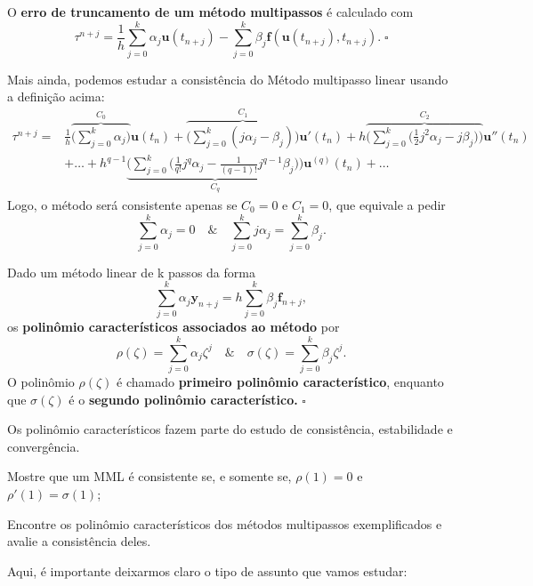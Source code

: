 \documentclass[../differential_methods.tex]{subfiles}
\begin{document}
\begin{def*}
	O \textbf{erro de truncamento de um método multipassos} é calculado com
	\[
		\tau^{n+j} = \frac{1}{h}\sum\limits_{j=0}^{k}\alpha_{j}\mathbf{u}(t_{n+j}) - \sum\limits_{j=0}^{k} \beta_{j}\mathbf{f}(\mathbf{u}(t_{n+j}), t_{n+j}). \; \square
	\]
\end{def*}
Mais ainda, podemos estudar a consistência do Método multipasso linear usando a definição acima:
\begin{align*}
	\tau^{n+j} = & \frac{1}{h}\overbrace{\biggl(\sum\limits_{j=0}^{k}\alpha_{j}\biggr)}^{C_{0}}\mathbf{u}(t_{n}) + \overbrace{\biggl(\sum\limits_{j=0}^{k}(j\alpha_{j}-\beta_{j})\biggr)}^{C_1}\mathbf{u}'(t_{n}) + h \overbrace{\biggl(\sum\limits_{j=0}^{k}\biggl(\frac{1}{2}j^{2}\alpha_{j}-j\beta_{j}\biggr) \biggr)}^{C_2}\mathbf{u}''(t_{n}) \\
	             & +\dotsc + h^{q-1}\underbrace{\biggl(\sum\limits_{j=0}^{k}\biggl(\frac{1}{q!}j^{q}\alpha_{j} - \frac{1}{(q-1)!}j^{q-1}\beta_{j}\biggr)\biggr)}_{C_q} \mathbf{u}^{(q)}(t_{n}) + \dotsc
\end{align*}
Logo, o método será consistente apenas se \(C_{0} = 0\) e \(C_{1}=0\), que equivale a pedir
\[
	\sum\limits_{j=0}^{k}\alpha_{j} = 0 \quad\&\quad \sum\limits_{j=0}^{k}j\alpha_{j} = \sum\limits_{j=0}^{k}\beta_{j}.
\]
\begin{def*}
	Dado um método linear de k passos da forma
	\[
		\sum\limits_{j=0}^{k}\alpha_{j}\mathbf{y}_{n+j} = h \sum\limits_{j=0}^{k}\beta_{j}\mathbf{f}_{n+j},
	\]
	os \textbf{polinômio característicos associados ao método} por
	\[
		\rho(\zeta ) = \sum\limits_{j=0}^{k}\alpha_{j}\zeta^{j} \quad\&\quad \sigma(\zeta ) = \sum\limits_{j=0}^{k}\beta_{j}\zeta^{j}.
	\]
	O polinômio \(\rho(\zeta )\) é chamado \textbf{primeiro polinômio característico}, enquanto que \(\sigma(\zeta )\) é o \textbf{segundo polinômio característico.} \(\square\)
\end{def*}
Os polinômio característicos fazem parte do estudo de consistência, estabilidade e convergência.
\begin{exr}
	Mostre que um MML é consistente se, e somente se, \(\rho(1) = 0\) e \(\rho'(1) = \sigma (1)\);
\end{exr}
\begin{exr}
	Encontre os polinômio característicos dos métodos multipassos exemplificados e avalie a consistência deles.
\end{exr}
Aqui, é importante deixarmos claro o tipo de assunto que vamos estudar:
\end{document}
